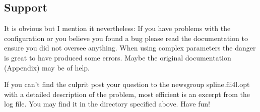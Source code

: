 \subsection{Support}

It is obvious but I mention it nevertheless: 
If you have problems with the configuration or you believe you found a bug please read 
the documentation to ensure you did not oversee anything. When using complex parameters
the danger is great to have produced some errors. Maybe the original documentation
(Appendix) may be of help.

If you can't find the culprit post your question to the newsgroup spline.fli4l.opt with
a detailed description of the problem, most efficient is an excerpt from the log file. 
You  may find it in the directory specified above. 
Have fun!
